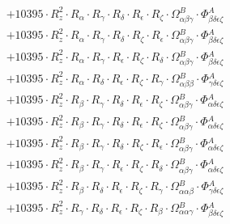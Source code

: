 \documentclass{article}
\begin{document}
\begin{subequations}
\begin{gather}
\begin{array}{c}
 \\[0.2em] 		 + 10395 \cdot R_{z}^{2} \cdot R_{\alpha{}} \cdot R_{\gamma{}} \cdot R_{\delta{}} \cdot R_{\epsilon{}} \cdot R_{\zeta{}} \cdot \Omega{}^{B}_{\alpha{}\beta{}\gamma{}} \cdot \Phi{}^{A}_{\beta{}\delta{}\epsilon{}\zeta{}} 
 \\[0.2em] 		 + 10395 \cdot R_{z}^{2} \cdot R_{\alpha{}} \cdot R_{\gamma{}} \cdot R_{\delta{}} \cdot R_{\zeta{}} \cdot R_{\epsilon{}} \cdot \Omega{}^{B}_{\alpha{}\beta{}\gamma{}} \cdot \Phi{}^{A}_{\beta{}\delta{}\epsilon{}\zeta{}} 
 \\[0.2em] 		 + 10395 \cdot R_{z}^{2} \cdot R_{\alpha{}} \cdot R_{\gamma{}} \cdot R_{\epsilon{}} \cdot R_{\zeta{}} \cdot R_{\delta{}} \cdot \Omega{}^{B}_{\alpha{}\beta{}\gamma{}} \cdot \Phi{}^{A}_{\beta{}\delta{}\epsilon{}\zeta{}} 
 \\[0.2em] 		 + 10395 \cdot R_{z}^{2} \cdot R_{\alpha{}} \cdot R_{\delta{}} \cdot R_{\epsilon{}} \cdot R_{\zeta{}} \cdot R_{\gamma{}} \cdot \Omega{}^{B}_{\alpha{}\beta{}\beta{}} \cdot \Phi{}^{A}_{\gamma{}\delta{}\epsilon{}\zeta{}} 
 \\[0.2em] 		 + 10395 \cdot R_{z}^{2} \cdot R_{\beta{}} \cdot R_{\gamma{}} \cdot R_{\delta{}} \cdot R_{\epsilon{}} \cdot R_{\zeta{}} \cdot \Omega{}^{B}_{\alpha{}\beta{}\gamma{}} \cdot \Phi{}^{A}_{\alpha{}\delta{}\epsilon{}\zeta{}} 
 \\[0.2em] 		 + 10395 \cdot R_{z}^{2} \cdot R_{\beta{}} \cdot R_{\gamma{}} \cdot R_{\delta{}} \cdot R_{\epsilon{}} \cdot R_{\zeta{}} \cdot \Omega{}^{B}_{\alpha{}\beta{}\gamma{}} \cdot \Phi{}^{A}_{\alpha{}\delta{}\epsilon{}\zeta{}} 
 \\[0.2em] 		 + 10395 \cdot R_{z}^{2} \cdot R_{\beta{}} \cdot R_{\gamma{}} \cdot R_{\delta{}} \cdot R_{\zeta{}} \cdot R_{\epsilon{}} \cdot \Omega{}^{B}_{\alpha{}\beta{}\gamma{}} \cdot \Phi{}^{A}_{\alpha{}\delta{}\epsilon{}\zeta{}} 
 \\[0.2em] 		 + 10395 \cdot R_{z}^{2} \cdot R_{\beta{}} \cdot R_{\gamma{}} \cdot R_{\epsilon{}} \cdot R_{\zeta{}} \cdot R_{\delta{}} \cdot \Omega{}^{B}_{\alpha{}\beta{}\gamma{}} \cdot \Phi{}^{A}_{\alpha{}\delta{}\epsilon{}\zeta{}} 
 \\[0.2em] 		 + 10395 \cdot R_{z}^{2} \cdot R_{\beta{}} \cdot R_{\delta{}} \cdot R_{\epsilon{}} \cdot R_{\zeta{}} \cdot R_{\gamma{}} \cdot \Omega{}^{B}_{\alpha{}\alpha{}\beta{}} \cdot \Phi{}^{A}_{\gamma{}\delta{}\epsilon{}\zeta{}} 
 \\[0.2em] 		 + 10395 \cdot R_{z}^{2} \cdot R_{\gamma{}} \cdot R_{\delta{}} \cdot R_{\epsilon{}} \cdot R_{\zeta{}} \cdot R_{\beta{}} \cdot \Omega{}^{B}_{\alpha{}\alpha{}\gamma{}} \cdot \Phi{}^{A}_{\beta{}\delta{}\epsilon{}\zeta{}} 

\end{array}
\end{gather}
\end{subequations}
\end{document}
